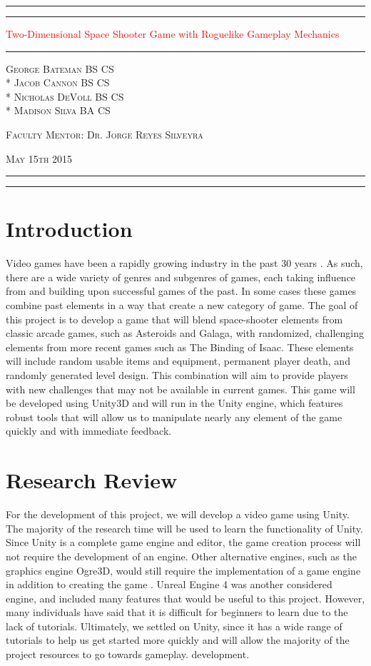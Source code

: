 \documentclass[12pt]{article}       %
\def\hs{\hspace{15pt}}
\newcommand*{\titleAT}{\begingroup %
\newlength{\drop} %
\drop=0.1\textheight %

\rule{\textwidth}{1pt}\par %
\vspace{2pt}\vspace{-\baselineskip} %
\rule{\textwidth}{0.4pt}\par %

\vspace{\drop} %
\centering %
\textcolor{Red}{ %
{\Huge Two-Dimensional Space Shooter Game with Roguelike Gameplay Mechanics}\\[0.5\baselineskip] %
{\Huge }} %

\vspace{0.25\drop} %
\rule{0.3\textwidth}{0.4pt}\par %
\vspace{\drop} %

{\Large \textsc{George Bateman BS CS \\* Jacob Cannon BS CS \\* Nicholas DeVoll BS CS \\* \vspace{3pt} Madison Silva BA CS}}\par %

\vfill %

{\large \textsc{Faculty Mentor: Dr. Jorge Reyes Silveyra}}\par 

{\large \textsc{May 15th 2015}}\par

\vspace*{\drop} %

\rule{\textwidth}{0.4pt}\par %
\vspace{2pt}\vspace{-\baselineskip} %
\rule{\textwidth}{1pt}\par %

\endgroup}
\begin{document}
\begin{titlepage}
\thispagestyle{empty}
\titleAT
\end{titlepage}

\newpage
\begin{titlepage}
\thispagestyle{empty}
\tableofcontents
\end{titlepage}

\begin{titlepage}
\thispagestyle{empty}
\listoffigures
\end{titlepage}


\newpage

\section{Introduction}
\label{sec:intro}

\hs Video games have been a rapidly growing industry in the past 30 years \cite{History}. As such, there are a wide variety of genres and subgenres of games, each taking influence from and building upon successful games of the past. In some cases these games combine past elements in a way that create a new category of game. The goal of this project is to develop a game that will blend space-shooter elements from classic arcade games, such as Asteroids and Galaga, with randomized, challenging elements from more recent games such as The Binding of Isaac. These elements will include random usable items and equipment, permanent player death, and randomly generated level design. This combination will aim to provide players with new challenges that may not be available in current games. This game will be developed using Unity3D and will run in the Unity engine, which features robust tools that will allow us to manipulate nearly any element of the game quickly and with immediate feedback.

\section{Research Review}
\label{sec:Research}

\hs For the development of this project, we will develop a video game using Unity. The majority of the research time will be used to learn the functionality of Unity. Since Unity is a complete game engine and editor, the game creation process will not require the development of an engine. Other alternative engines, such as the graphics engine Ogre3D, would still require the implementation of a game engine in addition to creating the game \cite{Ogre}. Unreal Engine 4 was another considered engine, and included many features that would be useful to this project. However, many individuals have said that it is difficult for beginners to learn due to the lack of tutorials. Ultimately, we settled on Unity, since it has a wide range of tutorials to help us get started more quickly and will allow the majority of the project resources to go towards gameplay. development.
\end{document}
